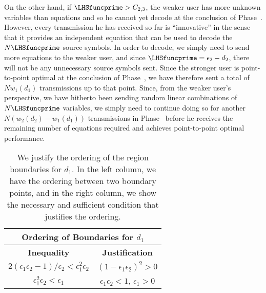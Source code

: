 
On the other hand, if $\LHSfuncprime > C_{2, 3}$, the weaker user has more unknown variables than equations and so he cannot yet decode at the conclusion of Phase~.  However, every transmission he has received so far is ``innovative'' in the sense that it provides an independent equation that can be used to decode the $N\LHSfuncprime$ source symbols.  In order to decode, we simply need to send more equations to the weaker user, and since $\LHSfuncprime = \epsilon_2 - d_2$, there will not be any unnecessary source symbols sent.  Since the stronger user is point-to-point optimal at the conclusion of Phase~, we have therefore sent a total of $Nw_1(d_1)$ transmissions up to that point.  Since, from the weaker user's perspective, we have hitherto been sending random linear combinations of $N\LHSfuncprime$ variables, we simply need to continue doing so for another $N(w_2(d_2) - w_1(d_1))$ transmissions in Phase~ before he receives the remaining number of equations required and achieves point-to-point optimal performance.

\begin{table}
	\begin{center}
		\begin{tabular}{| c | c |}
			\hline
			\multicolumn{2}{|c|}{{\bf Ordering of Boundaries for $d_1$}} \\
			\hline
			{\bf Inequality} & {\bf Justification}   \\ \hline
			$2(\epsilon_1\epsilon_2 - 1)/\epsilon_2 < \epsilon_1^2\epsilon_2$ & $(1 - \epsilon_1\epsilon_2)^2 > 0$ \\ \hline 
			$\epsilon_1^2\epsilon_2 < \epsilon_1$ & $\epsilon_1\epsilon_2 < 1$, $\epsilon_1 > 0$ \\ \hline 
			\hline
		\end{tabular}
	\end{center}
	\caption{We justify the ordering of the region boundaries for $d_1$.  In the left column, we have the ordering between two boundary points, and in the right column, we show the necessary and sufficient condition that justifies the ordering.}	
	\label{tab:d1_boundaries}	
\end{table}


